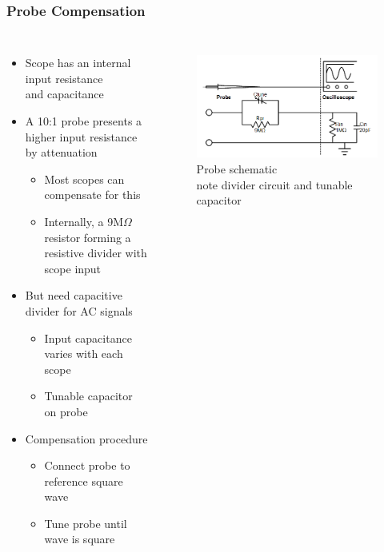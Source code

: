 \documentclass{beamer}
\begin{document}
\begin{frame}
\frametitle{Probe Compensation}
\begin{columns}[t]
\begin{itemize}
  \item Scope has an internal input resistance \\
  and capacitance
  \item A 10:1 probe presents a higher input resistance by attenuation
  \begin{itemize}
    \item Most scopes can compensate for this
    \item Internally, a 9M$\Omega$ resistor forming a resistive divider with scope input
  \end{itemize}
  \item But need capacitive divider for AC signals
  \begin{itemize}
    \item Input capacitance varies with each scope
    \item Tunable capacitor on probe
  \end{itemize}
  \item Compensation procedure
  \begin{itemize}
    \item Connect probe to reference square wave
    \item Tune probe until wave is square
  \end{itemize}
\end{itemize}

\begin{figure}
  \centering
  \includegraphics[width=1.0\columnwidth]{images-dis2/probe-internals} \newline
  Probe schematic \\
  {\scriptsize note divider circuit and tunable capacitor}
\end{figure}
\end{columns}
\hfill \\
\end{frame}
\end{document}
